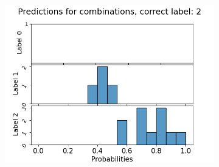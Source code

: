 \begin{figure}
\begin{subfigure}[t]{0.3\textwidth}
    \includegraphics[width=\textwidth]{files/figs/app/hists/femval/pc2.png}
  \end{subfigure}
\end{figure}
